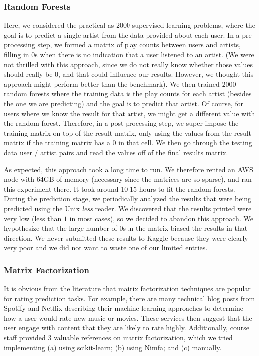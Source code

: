 \documentclass[10pt]{article}
\begin{document}
\subsubsection{Random Forests}
Here, we considered the practical as $2000$ supervised learning problems, where the goal is to predict a single artist from the data provided about each user. In a pre-processing step, we formed a matrix of  play counts between users and artists, filling in $0$s when there is no indication that a user listened to an artist. (We were not thrilled with this approach, since we do not really know whether those values should really be $0$, and that could influence our results. However, we thought this approach might perform better than the benchmark). We then trained $2000$ random forests where the training data is the play counts for each artist (besides the one we are predicting) and the goal is to predict that artist. Of course, for users where we know the result for that artist, we might get a different value with the random forest. Therefore, in a post-processing step, we super-impose the training matrix on top of the result matrix, only using the values from the result matrix if the training matrix has a $0$ in that cell. We then go through the testing data user / artist pairs and read the values off of the final results matrix.

As expected, this approach took a long time to run. We therefore rented an AWS node with 64GB of memory (necessary since the matrices are so sparse), and ran this experiment there. It took around 10-15 hours to fit the random forests. During the prediction stage, we periodically analyzed the results that were being predicted using the Unix {\it less} reader. We discovered that the results printed were very low (less than $1$ in most cases), so we decided to abandon this approach. We hypothesize that the large number of $0$s in the matrix biased the results in that direction. We never submitted these results to Kaggle because they were clearly very poor and we did not want to waste one of our limited entries.

\subsubsection{Matrix Factorization}
It is obvious from the literature that matrix factorization techniques are popular for rating prediction tasks. For example, there are many technical blog posts from Spotify and Netflix describing their machine learning approaches to determine how a user would rate new music or movies. These services then suggest that the user engage with content that they are likely to rate highly. Additionally, course staff provided $3$ valuable references on matrix factorization, which we tried implementing (a) using scikit-learn; (b) using Nimfa; and (c) manually.
\end{document}
